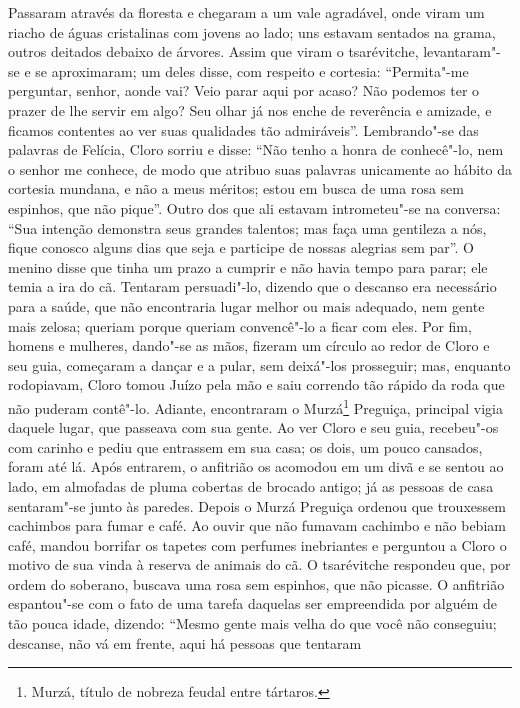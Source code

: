 Passaram através da floresta e chegaram a um vale agradável, onde viram
um riacho de águas cristalinas com jovens ao lado; uns estavam sentados
na grama, outros deitados debaixo de árvores. Assim que viram o
tsarévitche, levantaram"-se e se aproximaram; um deles disse, com
respeito e cortesia: ``Permita"-me perguntar, senhor, aonde vai? Veio
parar aqui por acaso? Não podemos ter o prazer de lhe servir em algo?
Seu olhar já nos enche de reverência e amizade, e ficamos contentes ao
ver suas qualidades tão admiráveis''. Lembrando"-se das palavras de
Felícia, Cloro sorriu e disse: ``Não tenho a honra de conhecê"-lo, nem o
senhor me conhece, de modo que atribuo suas palavras unicamente ao
hábito da cortesia mundana, e não a meus méritos; estou em busca de uma
rosa sem espinhos, que não pique''. Outro dos que ali estavam
intrometeu"-se na conversa: ``Sua intenção demonstra seus grandes
talentos; mas faça uma gentileza a nós, fique conosco alguns dias que
seja e participe de nossas alegrias sem par''. O menino disse que tinha
um prazo a cumprir e não havia tempo para parar; ele temia a ira do cã.
Tentaram persuadi"-lo, dizendo que o descanso era necessário para a
saúde, que não encontraria lugar melhor ou mais adequado, nem gente mais
zelosa; queriam porque queriam convencê"-lo a ficar com eles. Por fim,
homens e mulheres, dando"-se as mãos, fizeram um círculo ao redor de
Cloro e seu guia, começaram a dançar e a pular, sem deixá"-los prosseguir; mas, enquanto rodopiavam, Cloro tomou Juízo pela mão e saiu
correndo tão rápido da roda que não puderam contê"-lo. Adiante,
encontraram o Murzá\footnote{Murzá, título de nobreza feudal entre
  tártaros.} Preguiça, principal vigia daquele lugar, que passeava com
sua gente. Ao ver Cloro e seu guia, recebeu"-os com carinho e pediu que
entrassem em sua casa; os dois, um pouco cansados, foram até lá. Após
entrarem, o anfitrião os acomodou em um divã e se sentou ao lado, em
almofadas de pluma cobertas de brocado antigo; já as pessoas de casa
sentaram"-se junto às paredes. Depois o Murzá Preguiça ordenou que
trouxessem cachimbos para fumar e café. Ao ouvir que não fumavam
cachimbo e não bebiam café, mandou borrifar os tapetes com perfumes
inebriantes e perguntou a Cloro o motivo de sua vinda à reserva de
animais do cã. O tsarévitche respondeu que, por ordem do soberano,
buscava uma rosa sem espinhos, que não picasse. O anfitrião espantou"-se
com o fato de uma tarefa daquelas ser empreendida por alguém de tão
pouca idade, dizendo: ``Mesmo gente mais velha do que você não
conseguiu; descanse, não vá em frente, aqui há pessoas que tentaram
